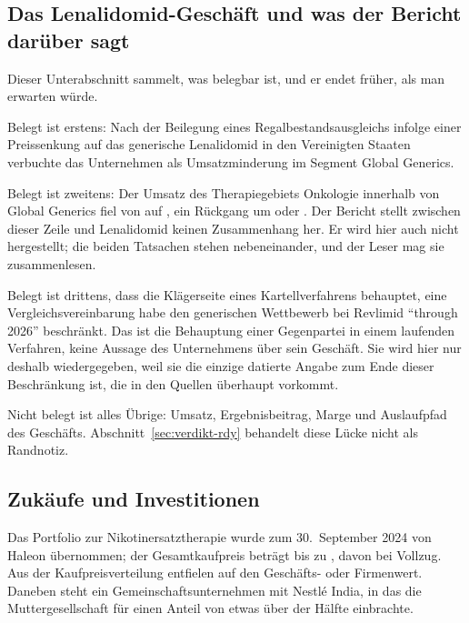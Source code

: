\subsection{Das Lenalidomid-Gesch\"aft und was der Bericht dar\"uber sagt}
\label{sec:lenalidomid-rdy}

Dieser Unterabschnitt sammelt, was belegbar ist, und er endet fr\"uher, als
man erwarten w\"urde.

Belegt ist erstens: Nach der Beilegung eines Regalbestandsausgleichs infolge
einer Preissenkung auf das generische Lenalidomid in den Vereinigten Staaten
verbuchte das Unternehmen \MioINR{\RdySsaEffekt} als Umsatzminderung im
Segment Global Generics.

Belegt ist zweitens: Der Umsatz des Therapiegebiets Onkologie innerhalb von
Global Generics fiel von \MioINR{\RdyOnkologieVJ} auf
\MioINR{\RdyOnkologie}, ein R\"uckgang um
\MioINR{\RdyOnkologieRueckgang} oder
\PctBetrag{\RdyOnkologieWachstum}.
Der Bericht stellt zwischen dieser Zeile und Lenalidomid keinen
Zusammenhang her. Er wird hier auch nicht hergestellt; die beiden Tatsachen
stehen nebeneinander, und der Leser mag sie zusammenlesen.

Belegt ist drittens, dass die Kl\"agerseite eines Kartellverfahrens behauptet,
eine Vergleichsvereinbarung habe den generischen Wettbewerb bei Revlimid
\enquote{through 2026} beschr\"ankt.
Das ist die Behauptung einer Gegenpartei in einem laufenden Verfahren, keine
Aussage des Unternehmens \"uber sein Gesch\"aft. Sie wird hier nur deshalb
wiedergegeben, weil sie die einzige datierte Angabe zum Ende dieser
Beschr\"ankung ist, die in den Quellen \"uberhaupt vorkommt.

Nicht belegt ist alles \"Ubrige: Umsatz, Ergebnisbeitrag, Marge und
Auslaufpfad des Gesch\"afts. Abschnitt~\ref{sec:verdikt-rdy} behandelt diese
L\"ucke nicht als Randnotiz.

\subsection{Zuk\"aufe und Investitionen}

Das Portfolio zur Nikotinersatztherapie wurde zum 30.~September 2024 von
Haleon \"ubernommen; der Gesamtkaufpreis betr\"agt bis zu
\MioINR{\RdyNrtKaufpreis}, davon \MioINR{\RdyNrtBarzahlung} bei
Vollzug.
Aus der Kaufpreisverteilung entfielen \MioINR{\RdyNrtGoodwill} auf den
Gesch\"afts- oder Firmenwert.
Daneben steht ein Gemeinschaftsunternehmen mit Nestl\'e India, in das die
Muttergesellschaft \MioINR{\RdyNestleInvest} f\"ur einen Anteil von etwas
\"uber der H\"alfte einbrachte.

